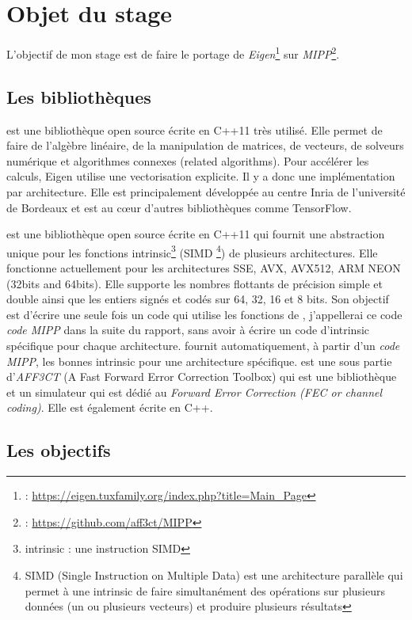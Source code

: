 \section{Objet du stage}

L'objectif de mon stage est de faire le portage de \emph{Eigen}\footnote{\Eigen:
\url{https://eigen.tuxfamily.org/index.php?title=Main_Page}} sur
\emph{MIPP}\footnote{\MIPP: \url{https://github.com/aff3ct/MIPP}}.

\subsection{Les bibliothèques}

\Eigen est une bibliothèque open source écrite en C++11 très utilisé. Elle permet
de faire de l'algèbre linéaire, de la manipulation de matrices, de vecteurs,
de solveurs numérique et algorithmes connexes (related algorithms). Pour accélérer les
calculs, Eigen utilise une vectorisation explicite. Il y a donc une implémentation par
architecture. Elle est principalement développée au centre Inria de l'université de
Bordeaux et est au cœur d'autres bibliothèques comme TensorFlow.


\MIPP est une bibliothèque open source écrite en C++11 qui fournit une abstraction
unique pour les fonctions intrinsic\footnote{intrinsic : une instruction SIMD} (SIMD
\footnote{SIMD (Single Instruction on Multiple Data) est une architecture parallèle
qui permet à une intrinsic de faire simultanément des opérations sur plusieurs données
(un ou plusieurs vecteurs) et produire plusieurs résultats}) de plusieurs architectures.
Elle fonctionne actuellement pour les architectures SSE, AVX, AVX512, ARM NEON (32bits and
64bits). Elle supporte les nombres flottants de précision simple et double ainsi que les
entiers signés et codés sur 64, 32, 16 et 8 bits. Son objectif est d'écrire une seule fois un
code qui utilise les fonctions de \MIPP, j'appellerai ce code \emph{code MIPP} dans
la suite du rapport, sans avoir à écrire un code d'intrinsic spécifique pour chaque
architecture. \MIPP fournit automatiquement, à partir d'un \emph{code MIPP}, les
bonnes intrinsic pour une architecture spécifique. \MIPP est une sous partie
d'\emph{AFF3CT} (A Fast Forward Error Correction Toolbox) qui est une bibliothèque et un
simulateur qui est dédié au \emph{Forward Error Correction (FEC or channel coding)}. Elle
est également écrite en C++.

\subsection{Les objectifs}


